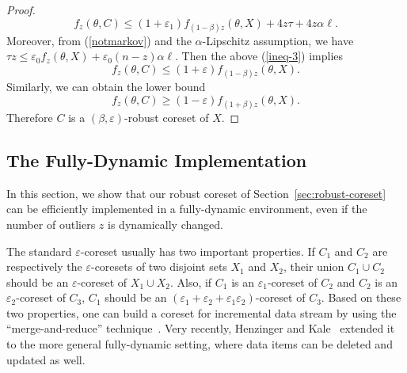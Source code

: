 \documentclass{article}
\begin{document}
\begin{proof}
\begin{equation}\label{ineq-3}
   f_{z}(\theta,C)\leq (1+\varepsilon_1)f_{(1-\beta)z}(\theta,X)+4z\tau+4z\alpha\ell.
\end{equation}
Moreover, from (\ref{notmarkov}) and the $\alpha$-Lipschitz assumption, we have  $ \tau z\leq \varepsilon_0 f_{z}(\theta,X)+\varepsilon_0(n-z)\alpha\ell $. Then the above (\ref{ineq-3}) implies
 \begin{equation}
    f_{z}(\theta,C) \leq (1+\varepsilon) f_{(1-\beta)z}(\theta,X).
\end{equation}
Similarly, we can obtain the lower bound
\begin{equation}
     f_{z}(\theta,C) \geq (1-\varepsilon) f_{(1+\beta)z}(\theta,X).
\end{equation}
Therefore $ C $ is a $(\beta,\varepsilon)$-robust coreset of $ X $.
\end{proof}


\subsection{The Fully-Dynamic Implementation}
\label{sec-dynamic}
In this section, we show that our robust coreset of Section~\ref{sec:robust-coreset} can be efficiently implemented in a fully-dynamic environment, even if the number of outliers $z$ is dynamically changed. 



The standard $ \varepsilon $-coreset usually has two important properties. 
If $ C_1 $ and $ C_2 $ are respectively the $ \varepsilon $-coresets of two disjoint sets $ X_1 $ and $ X_2 $, their union $ C_1\cup C_2 $ should be an $ \varepsilon$-coreset of $ X_1\cup X_2 $. Also, 
if $ C_1 $ is an $ \varepsilon_1$-coreset of $ C_2 $ and $ C_2 $ is an $ \varepsilon_2$-coreset of $ C_3 $,  $ C_1 $ should be an $ (\varepsilon_1+\varepsilon_2+\varepsilon_1\varepsilon_2) $-coreset of $ C_3 $. Based on these two properties, one can build a coreset for incremental data stream by using the ``merge-and-reduce'' technique~\cite{BentleyS80,Har-PeledM04}. Very recently, Henzinger and Kale~\cite{HenzingerK20} extended it to the more general fully-dynamic setting, where data items can be deleted and updated as well.
\end{document}
